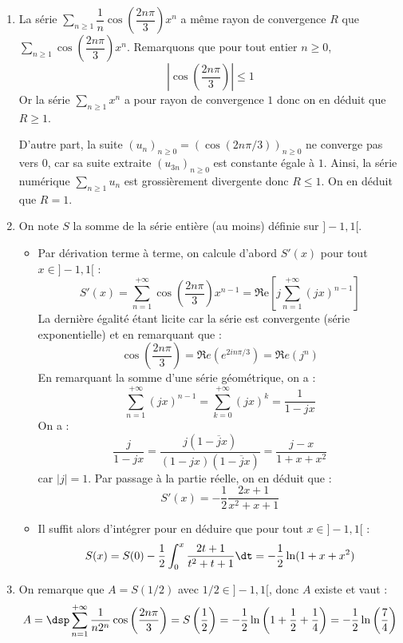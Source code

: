 \documentclass[a4paper,10pt]{report}
\newcommand{\Sum}[2]{\ensuremath{\textstyle{\sum\limits_{#1}^{#2}}}}
\begin{document}
\corr 

\begin{enumerate}
\item La série $\Sum{n \geq 1}{} \dfrac{1}{n}\cos\left(\dfrac{2n\pi}{3}\right)x^n$ a même rayon de convergence $R$ que $\Sum{n \geq 1}{} \cos\left(\dfrac{2n\pi}{3}\right)x^n$. Remarquons que pour tout entier $n \geq 0$,
\[
 \left\vert \cos\left(\dfrac{2n\pi}{3}\right)\right\vert\leq 1
\]
Or la série $\Sum{n \geq 1}{} x^n$ a pour rayon de convergence $1$ donc on en déduit que $R\geq 1$.

\medskip

D'autre part, la suite $(u_n)_{n \geq 0}=\left(\cos\left(2n\pi/3\right)\right)_{n \geq 0}$ ne converge pas vers $0$, car sa suite extraite $(u_{3n})_{n \geq 0}$ est constante égale à $1$. Ainsi, la série numérique $\Sum{n \geq 1}{} u_n$ est grossièrement divergente donc $R\leq 1$. On en déduit que $R=1$.
\item On note $S$ la somme de la série entière (au moins) définie sur $]-1,1[$.
\begin{itemize}
\item Par dérivation terme à terme, on calcule d'abord $S'(x)$ pour tout $x\in ]-1,1[$ : 
$$ S'(x)  = \sum_{n=1}^{+\infty}\cos\left(\dfrac{2n\pi}{3}\right)x^{n-1} = \Re\mathrm{e}\left[j\sum_{n=1}^{+\infty}(jx)^{n-1}\right]$$
La dernière égalité étant licite car la série est convergente (série exponentielle) et en remarquant que :
$$ \cos\left(\dfrac{2n\pi}{3}\right) = \Re e (e^{2i n \pi/3}) = \Re e (j^n)$$
En remarquant la somme d'une série géométrique, on a :
$$ \sum_{n=1}^{+\infty}(jx)^{n-1} = \sum_{k=0}^{+\infty}(jx)^{k} = \dfrac{1}{1-jx}$$
On a :
$$ \dfrac{j}{1-jx} =  \dfrac{j(1-\overline{j}x)}{(1-jx)(1-\overline{j}x)} =\dfrac{j-x}{1+x+x^2}$$
car $\vert j \vert =1$. Par passage à la partie réelle, on en déduit que :
$$S'(x)  = -\dfrac{1}{2}\dfrac{2x+1}{x^2+x+1}$$

\item Il suffit alors d'intégrer pour en déduire que pour tout $x\in ]-1,1[$ :  
$$ S(x)=S(0)-\dfrac{1}{2}\int_0^x\dfrac{2t+1}{t^2+t+1} \dt=-\dfrac{1}{2}\ln(1+x+x^2)$$

\end{itemize}
\item On remarque que $A=S(1/2)$ avec $1/2\in ]-1,1[$, donc $A$ existe et vaut : 
\[
A=\dsp\sum_{n=1}^{+\infty}\dfrac{1}{n2^n}\cos\left(\dfrac{2n\pi}{3}\right)=S\left(\dfrac{1}{2}\right)=-\dfrac{1}{2}\ln\left(1+\dfrac{1}{2}+\dfrac{1}{4}\right)=-\dfrac{1}{2}\ln\left(\dfrac{7}{4}\right)
\]
\end{enumerate}
\end{document}
